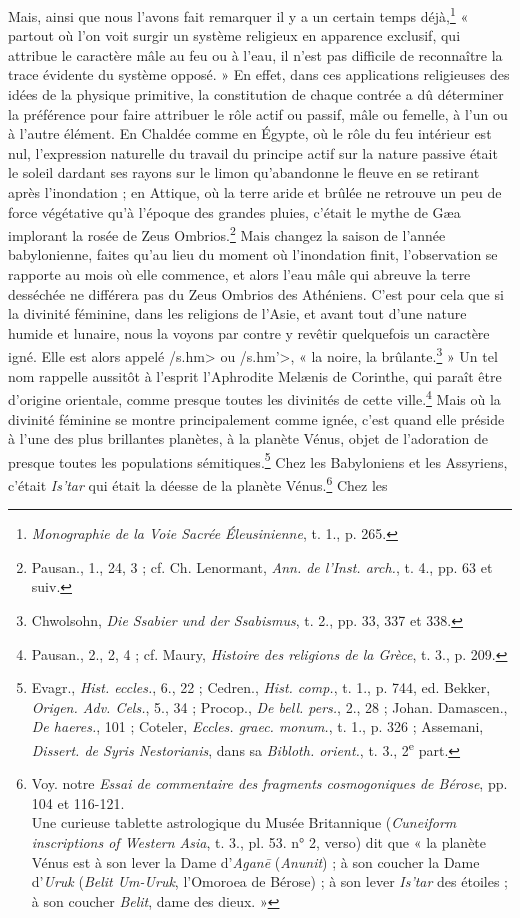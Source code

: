 \documentclass[a4paper, 11pt, oneside, landscape]{article}
\begin{document}
Mais, ainsi que nous l'avons fait remarquer il y a un certain temps déjà,\footnote{\emph{Monographie de la Voie Sacrée Éleusinienne}, t. 1., p. 265.} « partout où l'on voit surgir un système religieux en apparence exclusif, qui attribue le caractère mâle au feu ou à l'eau, il n'est pas difficile de reconnaître la trace évidente du système opposé. » En effet, dans ces applications religieuses des idées de la physique primitive, la constitution de chaque contrée a dû déterminer la préférence pour faire attribuer le rôle actif ou passif, mâle ou femelle, à l'un ou à l'autre élément. En Chaldée comme en Égypte, où le rôle du feu intérieur est nul, l'expression naturelle du travail du principe actif sur la nature passive était le soleil dardant ses rayons sur le limon qu'abandonne le fleuve en se retirant après l'inondation ; en Attique, où la terre aride et brûlée ne retrouve un peu de force végétative qu'à l'époque des grandes pluies, c'était le mythe de Gæa implorant la rosée de Zeus Ombrios.\footnote{Pausan., 1., 24, 3 ; cf. Ch. Lenormant, \emph{Ann. de l'Inst. arch.}, t. 4., pp. 63 et suiv.} Mais changez la saison de l'année babylonienne, faites qu'au lieu du moment où l'inondation finit, l'observation se rapporte au mois où elle commence, et alors l'eau mâle qui abreuve la terre desséchée ne différera pas du Zeus Ombrios des Athéniens. C'est pour cela que si la divinité féminine, dans les religions de l'Asie, et avant tout d'une nature humide et lunaire, nous la voyons par contre y revêtir quelquefois un caractère igné. Elle est alors appelé \</s.hm> ou \</s.hm'>, « la noire, la brûlante.\footnote{Chwolsohn, \emph{Die Ssabier und der Ssabismus}, t. 2., pp. 33, 337 et 338.} » Un tel nom rappelle aussitôt à l'esprit l'Aphrodite Melænis de Corinthe, qui paraît être d'origine orientale, comme presque toutes les divinités de cette ville.\footnote{Pausan., 2., 2, 4 ; cf. Maury, \emph{Histoire des religions de la Grèce}, t. 3., p. 209.} Mais où la divinité féminine se montre principalement comme ignée, c'est quand elle préside à l'une des plus brillantes planètes, à la planète Vénus, objet de l'adoration de presque toutes les populations sémitiques.\footnote{Evagr., \emph{Hist. eccles.}, 6., 22 ; Cedren., \emph{Hist. comp.}, t. 1., p. 744, ed. Bekker, \emph{Origen. Adv. Cels.}, 5., 34 ; Procop., \emph{De bell. pers.}, 2., 28 ; Johan. Damascen., \emph{De haeres.}, 101 ; Coteler, \emph{Eccles. graec. monum.}, t. 1., p. 326 ; Assemani, \emph{Dissert. de Syris Nestorianis}, dans sa \emph{Bibloth. orient.}, t. 3., 2\textsuperscript{e} part.} Chez les Babyloniens et les Assyriens, c'était \emph{Is'tar} qui était la déesse de la planète Vénus.\footnote{Voy. notre \emph{Essai de commentaire des fragments cosmogoniques de Bérose}, pp. 104 et 116-121.\\\hspace*{5mm}Une curieuse tablette astrologique du Musée Britannique (\emph{Cuneiform inscriptions of Western Asia}, t. 3., pl. 53. n° 2, verso) dit que « la planète Vénus est à son lever la Dame d'\emph{Agan\={e}} (\emph{Anunit}) ; à son coucher la Dame d'\emph{Uruk} (\emph{Belit Um-Uruk}, l'Omoroea de Bérose) ; à son lever \emph{Is'tar} des étoiles ; à son coucher \emph{Belit}, dame des dieux. »} Chez les 
\end{document}
